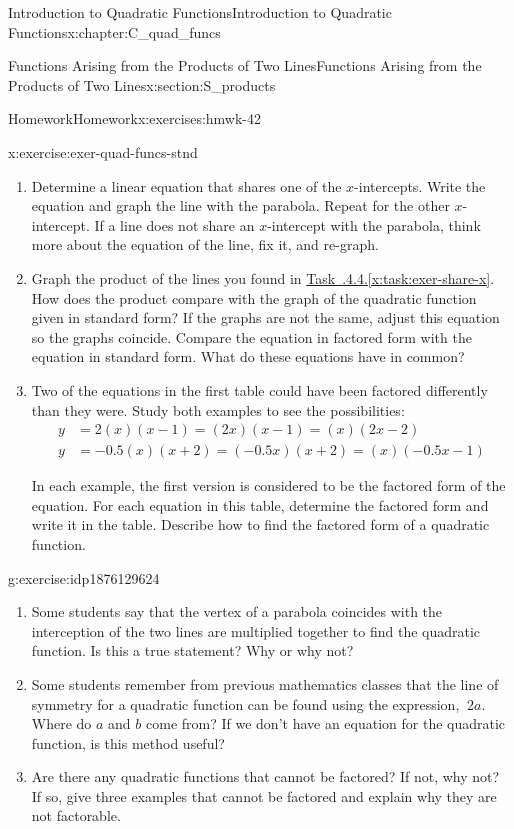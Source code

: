 \documentclass[oneside,10pt,]{book}
\newcommand{\xreffont}{\relax}
\numberwithin{equation}{chapter}
\newcommand{\amp}{&}
\begin{document}
\begin{chapterptx}{Introduction to Quadratic Functions}{}{Introduction to Quadratic Functions}{}{}{x:chapter:C_quad_funcs}
\begin{sectionptx}{Functions Arising from the Products of Two Lines}{}{Functions Arising from the Products of Two Lines}{}{}{x:section:S_products}
\begin{exercises-subsection}{Homework}{}{Homework}{}{}{x:exercises:hmwk-42}
\begin{divisionexercise}{4}{}{}{x:exercise:exer-quad-funcs-stnd}
\begin{enumerate}[font=\bfseries,label=(\alph*),ref=\alph*]
\item\label{x:task:exer-share-x}Determine a linear equation that shares one of the \(x\)-intercepts. Write the equation and graph the line with the parabola. Repeat for the other \(x\)-intercept. If a line does not share an \(x\)-intercept with the parabola, think more about the equation of the line, fix it, and re-graph.%
\item{}Graph the product of the lines you found in \hyperref[x:task:exer-share-x]{Task~{\xreffont 4.2.4.4}.{\xreffont\ref{x:task:exer-share-x}}}. How does the product compare with the graph of the quadratic function given in standard form? If the graphs are not the same, adjust this equation so the graphs coincide. Compare the equation in factored form with the equation in standard form. What do these equations have in common?%
\item{}Two of the equations in the first table could have been factored differently than they were. Study both examples to see the possibilities:%
\begin{align*}
y \amp = 2(x)(x - 1) = (2x)(x - 1) = (x)(2x - 2)\\
y \amp = -0.5(x)(x + 2) = (-0.5x)(x + 2) = (x)(-0.5x - 1)
\end{align*}
%
\par
In each example, the first version is considered to be the factored form of the equation. For each equation in this table, determine the factored form and write it in the table. Describe how to find the factored form of a quadratic function.%
\end{enumerate}
\end{divisionexercise}%
\begin{divisionexercise}{5}{}{}{g:exercise:idp1876129624}%
\begin{enumerate}[font=\bfseries,label=(\alph*),ref=\alph*]
\item{}Some students say that the vertex of a parabola coincides with the interception of the two lines are multiplied together to find the quadratic function. Is this a true statement? Why or why not?%
\item{}Some students remember from previous mathematics classes that the line of symmetry for a quadratic function can be found using the expression, \(\
2a\). Where do \(a\) and \(b\) come from? If we don't have an equation for the quadratic function, is this method useful?%
\item{}Are there any quadratic functions that cannot be factored? If not, why not? If so, give three examples that cannot be factored and explain why they are not factorable.%

\end{enumerate}
\end{divisionexercise}
\end{exercises-subsection}
\end{sectionptx}
\end{chapterptx}
\end{document}
